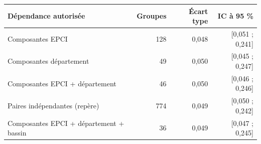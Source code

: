 \begin{tabularx}{\linewidth}{Xrrr}
\toprule
Dépendance autorisée & Groupes & Écart type & IC à 95 \% \\
\midrule
Composantes EPCI & 128 & 0,048 & [0,051 ; 0,241] \\
Composantes département & 49 & 0,050 & [0,045 ; 0,247] \\
Composantes EPCI + département & 46 & 0,050 & [0,046 ; 0,246] \\
Paires indépendantes (repère) & 774 & 0,049 & [0,050 ; 0,242] \\
Composantes EPCI + département + bassin & 36 & 0,049 & [0,047 ; 0,245] \\
\bottomrule
\end{tabularx}

